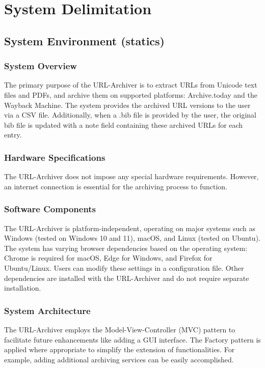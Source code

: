 \section{System Delimitation}

\subsection{System Environment (statics)}
\subsubsection{System Overview}
The primary purpose of the URL-Archiver is to extract URLs from Unicode text files and PDFs, and archive them on supported platforms: Archive.today and the Wayback Machine. The system provides the archived URL versions to the user via a CSV file. Additionally, when a .bib file is provided by the user, the original bib file is updated with a note field containing these archived URLs for each entry.

\subsubsection{Hardware Specifications}
The URL-Archiver does not impose any special hardware requirements. However, an internet connection is essential for the archiving process to function.

\subsubsection{Software Components}
The URL-Archiver is platform-independent, operating on major systems such as Windows (tested on Windows 10 and 11), macOS, and Linux (tested on Ubuntu). The system has varying browser dependencies based on the operating system: Chrome is required for macOS, Edge for Windows, and Firefox for Ubuntu/Linux. Users can modify these settings in a configuration file. Other dependencies are installed with the URL-Archiver and do not require separate installation.

\subsubsection{System Architecture}
The URL-Archiver employs the Model-View-Controller (MVC) pattern to facilitate future enhancements like adding a GUI interface. The Factory pattern is applied where appropriate to simplify the extension of functionalities. For example, adding additional archiving services can be easily accomplished.

